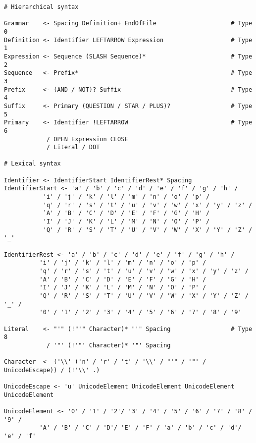 \documentclass[diploma]{softlab-thesis}
\begin{document}
\begin{Verbatim}
# Hierarchical syntax

Grammar    <- Spacing Definition+ EndOfFile                     # Type 0
Definition <- Identifier LEFTARROW Expression                   # Type 1
Expression <- Sequence (SLASH Sequence)*                        # Type 2
Sequence   <- Prefix*                                           # Type 3
Prefix     <- (AND / NOT)? Suffix                               # Type 4
Suffix     <- Primary (QUESTION / STAR / PLUS)?                 # Type 5
Primary    <- Identifier !LEFTARROW                             # Type 6
            / OPEN Expression CLOSE
            / Literal / DOT

# Lexical syntax

Identifier <- IdentifierStart IdentifierRest* Spacing
IdentifierStart <- 'a' / 'b' / 'c' / 'd' / 'e' / 'f' / 'g' / 'h' /
		   'i' / 'j' / 'k' / 'l' / 'm' / 'n' / 'o' / 'p' /
		   'q' / 'r' / 's' / 't' / 'u' / 'v' / 'w' / 'x' / 'y' / 'z' /
		   ᾽A' / 'B' / 'C' / 'D' / 'E' / 'F' / 'G' / 'H' /
		   'I' / 'J' / 'K' / 'L' / 'M' / 'N' / 'O' / 'P' /
		   'Q' / 'R' / 'S' / 'T' / 'U' / 'V' / 'W' / 'X' / 'Y' / 'Z' / '_'

IdentifierRest <- 'a' / 'b' / 'c' / 'd' / 'e' / 'f' / 'g' / 'h' /
		  'i' / 'j' / 'k' / 'l' / 'm' / 'n' / 'o' / 'p' /
		  'q' / 'r' / 's' / 't' / 'u' / 'v' / 'w' / 'x' / 'y' / 'z' /
		  'A' / 'B' / 'C' / 'D' / 'E' / 'F' / 'G' / 'H' /
		  'I' / 'J' / 'K' / 'L' / 'M' / 'N' / 'O' / 'P' /
		  'Q' / 'R' / 'S' / 'T' / 'U' / 'V' / 'W' / 'X' / 'Y' / 'Z' / '_' /
		  '0' / '1' / '2' / '3' / '4' / '5' / '6' / '7' / '8' / '9'

Literal    <- "'" (!"'" Character)* "'" Spacing                 # Type 8
            / '"' (!'"' Character)* '"' Spacing

Character  <- ('\\' ('n' / 'r' / 't' / '\\' / "'" / '"' / UnicodeEscape)) / (!'\\' .)

UnicodeEscape <- 'u' UnicodeElement UnicodeElement UnicodeElement UnicodeElement

UnicodeElement <- '0' / '1' / '2'/ '3' / '4' / '5' / '6' / '7' / '8' / '9' /
		  'A' / 'B' / 'C' / 'D'/ 'E' / 'F' / 'a' / 'b' / 'c' / 'd'/ 'e' / 'f'



\end{Verbatim}
\end{document}
